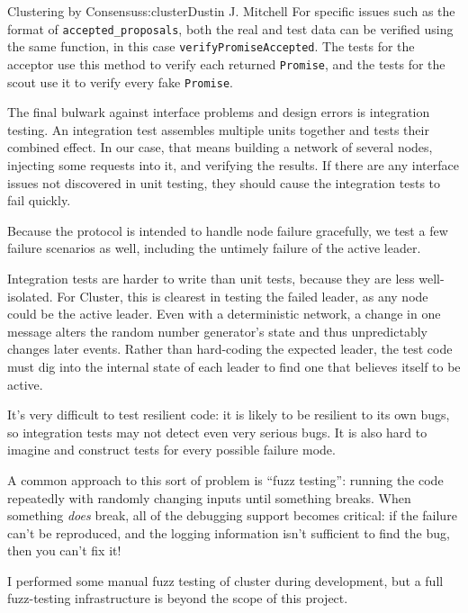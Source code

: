 \begin{aosachapter}{Clustering by Consensus}{s:cluster}{Dustin J. Mitchell}
For specific issues such as the format of \texttt{accepted\_proposals},
both the real and test data can be verified using the same function, in
this case \texttt{verifyPromiseAccepted}. The tests for the acceptor use
this method to verify each returned \texttt{Promise}, and the tests for
the scout use it to verify every fake \texttt{Promise}.

\label{integration-testing}

The final bulwark against interface problems and design errors is
integration testing. An integration test assembles multiple units
together and tests their combined effect. In our case, that means
building a network of several nodes, injecting some requests into it,
and verifying the results. If there are any interface issues not
discovered in unit testing, they should cause the integration tests to
fail quickly.

Because the protocol is intended to handle node failure gracefully, we
test a few failure scenarios as well, including the untimely failure of
the active leader.

Integration tests are harder to write than unit tests, because they are
less well-isolated. For Cluster, this is clearest in testing the failed
leader, as any node could be the active leader. Even with a
deterministic network, a change in one message alters the random number
generator's state and thus unpredictably changes later events. Rather
than hard-coding the expected leader, the test code must dig into the
internal state of each leader to find one that believes itself to be
active.

\label{fuzz-testing}

It's very difficult to test resilient code: it is likely to be resilient
to its own bugs, so integration tests may not detect even very serious
bugs. It is also hard to imagine and construct tests for every possible
failure mode.

A common approach to this sort of problem is ``fuzz testing'': running
the code repeatedly with randomly changing inputs until something
breaks. When something \emph{does} break, all of the debugging support
becomes critical: if the failure can't be reproduced, and the logging
information isn't sufficient to find the bug, then you can't fix it!

I performed some manual fuzz testing of cluster during development, but
a full fuzz-testing infrastructure is beyond the scope of this project.


\end{aosachapter}

